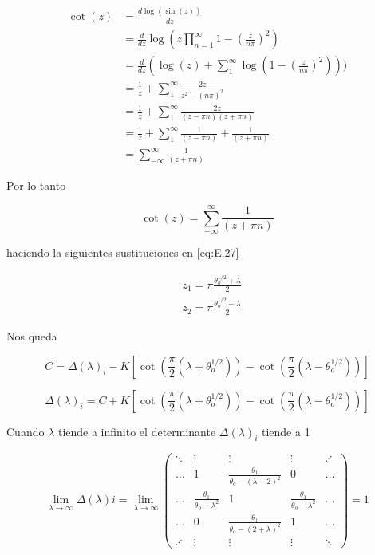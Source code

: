 \begin{equation}\label{eq:A.26}
\begin{aligned}
\cot(z)&=\frac{d\log(\sin(z))}{dz}\\
&=\frac{d}{dz}\log(z \prod_{n=1}^{\infty} 1-(\frac{z}{n \pi})^2)\\
&=\frac{d}{dz}(\log(z)+\sum^{\infty}_{1}\log(1-(\frac{z}{n \pi})^2)))\\
&=\frac{1}{z}+\sum^{\infty}_{1}\frac{2z}{z^2-(n\pi)^2}\\
&=\frac{1}{z}+\sum^{\infty}_{1}\frac{2z}{(z-\pi n)(z+\pi n)}\\
&=\frac{1}{z}+\sum^{\infty}_{1}\frac{1}{(z-\pi n)}+\frac{1}{(z+\pi n)}\\
&=\sum^{\infty}_{-\infty}\frac{1}{(z+\pi n)}
\end{aligned}
\end{equation}

Por lo tanto 

\begin{equation}\label{eq:E.27}
    \cot(z)=\sum^{\infty}_{-\infty}\frac{1}{(z+\pi n)}
\end{equation}

haciendo la siguientes sustituciones en \ref{eq:E.27}

\begin{equation}\label{eq:E.28}
\begin{aligned}
&z_1=\pi \frac{\theta_o^{1/2}+\lambda}{2}\\
&z_2=\pi \frac{\theta_o^{1/2}-\lambda}{2}
\end{aligned}
\end{equation}

Nos queda

 \begin{equation}\label{eq:E.29}
     C=\Delta(\lambda)_{i}-K\left[\cot(\frac{\pi}{2}(\lambda+\theta_o^{1/2}))-\cot(\frac{\pi}{2}(\lambda-\theta_o^{1/2}))\right]
 \end{equation}

\begin{equation}\label{eq:E.30}
     \Delta(\lambda)_{i}=C+K[\cot(\frac{\pi}{2}(\lambda+\theta_o^{1/2}))-\cot(\frac{\pi}{2}(\lambda-\theta_o^{1/2}))]
 \end{equation}
 
 Cuando $\lambda$ tiende a infinito el determinante $\Delta(\lambda)_{i}$ tiende a 1
 
 \large
\begin{equation}\label{eq:E.31}
\lim_{\lambda\rightarrow \infty}\Delta(\lambda){i}=\lim_{\lambda\rightarrow\infty} 
\begin{pmatrix}
\ddots & \vdots & \vdots & \vdots & \iddots \\
\dots & 1 & \frac{\theta_1}{\theta_o-(\lambda-2)^2} & 0 & \dots \\ 
\dots  & \frac{\theta_1}{\theta_o-\lambda^2} & 1 & \frac{\theta_1}{\theta_o-\lambda^2} &\dots\\
 \dots  & 0 & \frac{\theta_1}{\theta_o- (2+\lambda)^2} & 1 & \dots\\ 
 \iddots & \vdots & \vdots & \vdots & \ddots
\end{pmatrix}=1
\end{equation}
\normalsize
 
